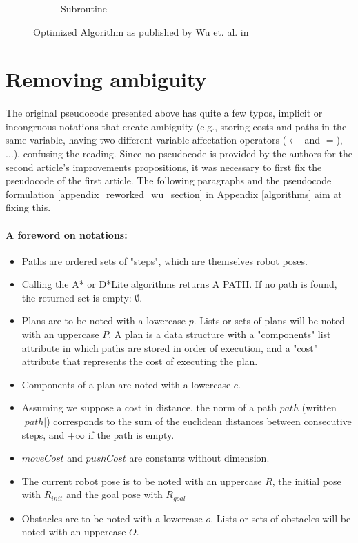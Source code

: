 \begin{figure}[H]
\begin{subfigure}{.45\textwidth}
  \caption{Subroutine}
  \label{fig:Wu_Original_Algorithm-algo4}
\end{subfigure}
\caption{Optimized Algorithm as published by Wu et. al. in \parencite{wu_navigation_2010}}
\label{fig:Wu_Original_Algorithm-optimized}
\end{figure}

\section{Removing ambiguity}\label{removing_ambiguity_section}
\paragraph{} The original pseudocode presented above has quite a few typos, implicit or incongruous notations that create ambiguity (e.g., storing costs and paths in the same variable, having two different variable affectation operators ($\gets$ and $=$), ...), confusing the reading. Since no pseudocode is provided by the authors for the second article's improvements propositions, it was necessary to first fix the pseudocode of the first article. The following paragraphs and the pseudocode formulation \ref{appendix_reworked_wu_section} in Appendix \ref{algorithms} aim at fixing this.

\paragraph{A foreword on notations:}

\begin{itemize}
  \item Paths are ordered sets of "steps", which are themselves robot poses.
  \item Calling the A* or D*Lite algorithms returns A PATH. If no path is found, the returned set is empty: $\emptyset$.
  \item Plans are to be noted with a lowercase $p$. Lists or sets of plans will be noted with an uppercase $P$. A plan is a data structure with a "components" list attribute in which paths are stored in order of execution, and a "cost" attribute that represents the cost of executing the plan.
  \item Components of a plan are noted with a lowercase $c$.
  \item Assuming we suppose a cost in distance, the norm of a path $path$ (written $|path|$) corresponds to the sum of the euclidean distances between consecutive steps, and $+\infty$ if the path is empty.
  \item $moveCost$ and $pushCost$ are constants without dimension.
  \item The current robot pose is to be noted with an uppercase $R$, the initial pose with $R_{init}$ and the goal pose with $R_{goal}$
  \item Obstacles are to be noted with a lowercase $o$. Lists or sets of obstacles will be noted with an uppercase $O$.
\end{itemize}

